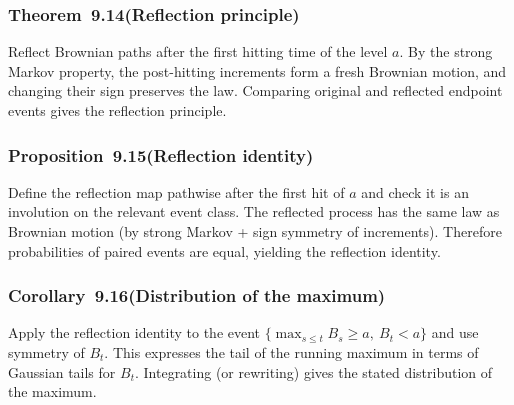 \documentclass[11pt,a4paper]{article}
\newcommand{\proofcapsule}[4]{%
  \subsubsection*{#1~#2\quad \textnormal{\small(#3)}}%
  #4}
\begin{document}
\proofcapsule{Theorem}{9.14}{Reflection principle}{Reflect Brownian paths after the first hitting time of the level $a$. By the strong Markov property, the post-hitting increments form a fresh Brownian motion, and changing their sign preserves the law. Comparing original and reflected endpoint events gives the reflection principle.}
\proofcapsule{Proposition}{9.15}{Reflection identity}{Define the reflection map pathwise after the first hit of $a$ and check it is an involution on the relevant event class. The reflected process has the same law as Brownian motion (by strong Markov + sign symmetry of increments). Therefore probabilities of paired events are equal, yielding the reflection identity.}
\proofcapsule{Corollary}{9.16}{Distribution of the maximum}{Apply the reflection identity to the event $\{\max_{s\le t} B_s\ge a,\ B_t<a\}$ and use symmetry of $B_t$. This expresses the tail of the running maximum in terms of Gaussian tails for $B_t$. Integrating (or rewriting) gives the stated distribution of the maximum.}
\end{document}
